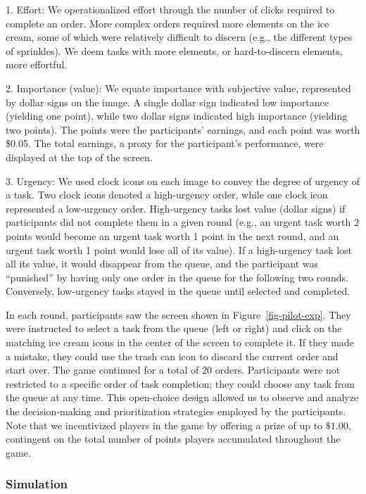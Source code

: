 \documentclass[
]{article}
\begin{document}
1. Effort: We operationalized effort through the number of clicks
required to complete an order. More complex orders required more
elements on the ice cream, some of which were relatively difficult to
discern (e.g., the different types of sprinkles). We deem tasks with
more elements, or hard-to-discern elements, more effortful.

2. Importance (value): We equate importance with subjective value,
represented by dollar signs on the image. A single dollar sign indicated
low importance (yielding one point), while two dollar signs indicated
high importance (yielding two points). The points were the participants'
earnings, and each point was worth \$0.05. The total earnings, a proxy
for the participant's performance, were displayed at the top of the
screen.

3. Urgency: We used clock icons on each image to convey the degree of
urgency of a task. Two clock icons denoted a high-urgency order, while
one clock icon represented a low-urgency order. High-urgency tasks lost
value (dollar signs) if participants did not complete them in a given
round (e.g., an urgent task worth 2 points would become an urgent task
worth 1 point in the next round, and an urgent task worth 1 point would
lose all of its value). If a high-urgency task lost all its value, it
would disappear from the queue, and the participant was ``punished'' by
having only one order in the queue for the following two rounds.
Conversely, low-urgency tasks stayed in the queue until selected and
completed.

In each round, participants saw the screen shown in
Figure~\ref{fig-pilot-exp}. They were instructed to select a task from
the queue (left or right) and click on the matching ice cream icons in
the center of the screen to complete it. If they made a mistake, they
could use the trash can icon to discard the current order and start
over. The game continued for a total of 20 orders. Participants were not
restricted to a specific order of task completion; they could choose any
task from the queue at any time. This open-choice design allowed us to
observe and analyze the decision-making and prioritization strategies
employed by the participants. Note that we incentivized players in the
game by offering a prize of up to \(\$1.00\), contingent on the total
number of points players accumulated throughout the game.

\hypertarget{simulation-1}{%
\subsubsection{Simulation}\label{simulation-1}}
\end{document}
